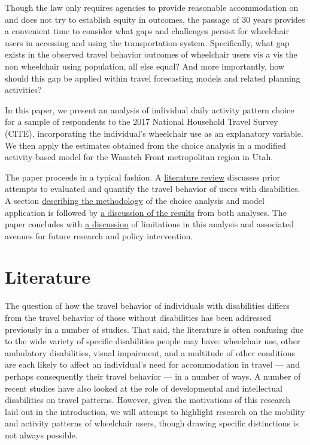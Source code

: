 \documentclass[3p, authoryear, review]{elsarticle} %
\begin{document}
Though the law only requires agencies to provide reasonable accommodation on and
does not try to establish equity in outcomes, the passage of 30 years provides a
convenient time to consider what gaps and challenges persist for wheelchair
users in accessing and using the transportation system. Specifically, what gap
exists in the observed travel behavior outcomes of wheelchair users vis a vis
the non wheelchair using population, all else equal? And more importantly, how
should this gap be applied within travel forecasting models and related planning
activities?

In this paper, we present an analysis of individual daily activity pattern choice
for a sample of respondents to the 2017 National Household Travel Survey (CITE),
incorporating the individual's wheelchair use as an explanatory variable.
We then apply the estimates obtained from the choice analysis in a modified
activity-based model for the Wasatch Front metropolitan region in Utah.

The paper proceeds in a typical fashion. A \protect\hyperlink{literature}{literature review}
discusses prior attempts to evaluated and quantify the travel behavior of
users with disabilities. A section \protect\hyperlink{methodology}{describing the methodology}
of the choice analysis and model application is followed by \protect\hyperlink{results}{a discussion of the results}
from both analyses. The paper concludes with \protect\hyperlink{discussion}{a discussion}
of limitations in this analysis and associated avenues for future research and
policy intervention.

\hypertarget{sec-literature}{%
\section{Literature}\label{sec-literature}}

The question of how the travel behavior of individuals with disabilities differs
from the travel behavior of those without disabilities has been addressed
previously in a number of studies. That said, the literature is often confusing
due to the wide variety of specific disabilities people may have: wheelchair use,
other ambulatory disabilities, visual impairment, and a multitude of other
conditions are each likely to affect an individual's need for accommodation in
travel --- and perhaps consequently their travel behavior --- in a number of ways.
A number of recent studies have also looked at the role of developmental \citet{Wasfi2007}
and intellectual \citet{Feeley2019} disabilities on travel patterns. However,
given the motivations of this research laid out in the introduction, we will attempt to highlight
research on the mobility and activity patterns of wheelchair users, though
drawing specific distinctions is not always possible.
\end{document}

